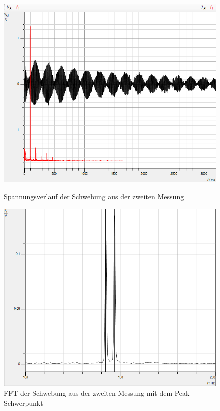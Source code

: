 \documentclass[a4paper, 11pt]{article}
\begin{document}
\begin{figure}[H]
	\begin{minipage}[t]{0.45\linewidth}
	\includegraphics[scale=0.4]{../Schwebung2.png}
	\caption{Spannungsverlauf der Schwebung aus der zweiten Messung}
	\label{Abbildung 5}
	\end{minipage}
	\hspace{0.1\linewidth}
	\begin{minipage}[t]{0.45\linewidth}
	\includegraphics[scale=0.4]{../Schwebung2F.png}
	\caption{FFT der Schwebung aus der zweiten Messung mit dem Peak-Schwerpunkt}
	\label{Abbildung 6}
	\end{minipage}
	\label{fig:Aufbau des Versuchs}
\end{figure}
\end{document}
